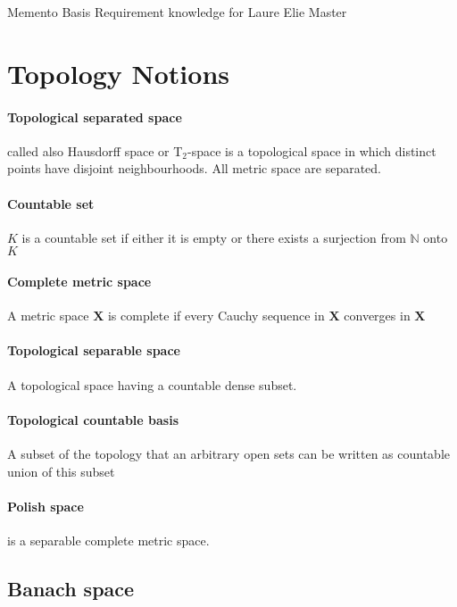 \documentclass[a4paper,10pt]{article}
\begin{document}
\begin{center}Memento Basis Requirement knowledge for Laure Elie Master\end{center}
\section{Topology Notions}
\paragraph{Topological separated space} called also Hausdorff space or T$_2$-space is a topological space in which distinct points have disjoint neighbourhoods. All metric space are separated.

\paragraph{Countable set} $K$ is a countable set if either it is empty or there exists a surjection from $\mathbb{N}$ onto $K$ 

\paragraph{Complete metric space} A metric space $\textbf{X}$ is complete if every Cauchy sequence in $\textbf{X}$ converges in $\textbf{X}$ 

\paragraph{Topological separable space} A topological space having a countable dense subset.

\paragraph{Topological countable basis} A subset of the topology that an arbitrary open sets can be written as countable union of this subset

\paragraph{Polish space} is a separable complete metric space.

\subsection{Banach space}
\end{document}
